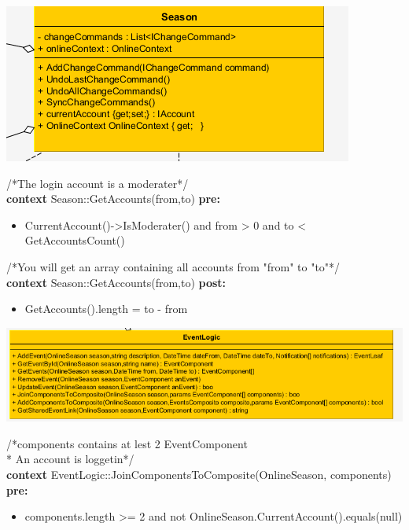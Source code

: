 \documentclass[a4paper]{article}
\begin{document}
\includegraphics[scale = 1]{Season.png}

\noindent
/*The login account is a moderater*/\\
\textbf{context} Season::GetAccounts(from,to) \textbf{pre:}
\begin{itemize}[noitemsep,nolistsep]
\item[] CurrentAccount()->IsModerater() and
\subitem from > 0 and 
\subsubitem to < GetAccountsCount()\\
\end{itemize}

/*You will get an array containing all accounts from "from" to "to"*/\\
\noindent   
\textbf{context} Season::GetAccounts(from,to) \textbf{post:}
\begin{itemize}[noitemsep,nolistsep]
\item[] GetAccounts().length = to - from\\
\end{itemize}


\includegraphics[scale = 1]{EventLogic.png}

\noindent
/*components contains at lest 2 EventComponent\\
* An account is loggetin*/\\
\textbf{context} EventLogic::JoinComponentsToComposite(OnlineSeason, components) \textbf{pre:}
\begin{itemize}[noitemsep,nolistsep]
\item[] components.length >= 2  and
\subitem not OnlineSeason.CurrentAccount().equals(null)\\
\end{itemize}
\end{document}
